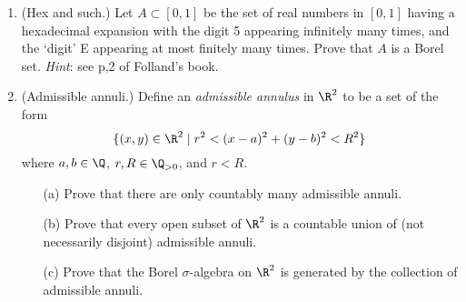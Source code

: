 \documentclass[11pt]{article}
\begin{document}
\begin{enumerate}
  \item (Hex and such.)
    Let $A\subset [0,1]$ be the set of real numbers in $[0,1]$ having a hexadecimal  expansion with the  digit 5 appearing infinitely many times, and the `digit' E appearing at most finitely many times. Prove that $A$ is a Borel set. \textit{Hint}: see p,2 of Folland's book.

\item (Admissible annuli.)
  Define an \emph{admissible annulus} in $\R^2$ to be a set of the form
  \begin{equation*}
    \{(x,y)\in\R^2\mid r^2<(x-a)^2+(y-b)^2<R^2\}
  \end{equation*}
  where $a,b\in\Q$, $r,R\in\Q_{>0}$, and $r<R$.
  \begin{itemize}
  \item[(a)]
    Prove that there are only countably many admissible annuli.
  \item[(b)]
    Prove that every open subset of $\R^2$ is a countable union of (not necessarily disjoint) admissible annuli.
  \item[(c)]
    Prove that the Borel $\sigma$-algebra on $\R^2$ is generated by the collection of admissible annuli.
  \end{itemize}
\end{enumerate}
\end{document}
